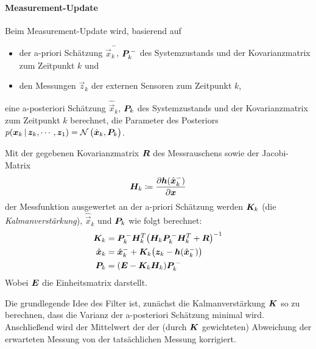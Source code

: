 				\paragraph{Measurement-Update} %
					Beim Measurement-Update wird, basierend auf
					\begin{itemize}
						\item der a-priori Schätzung \( \hat{\vec{x}}_k^- \), \( \bm{P}_k^{\,-} \) des Systemzustands und der Kovarianzmatrix zum Zeitpunkt \(k\) und
						\item den Messungen \( \vec{z}_k \) der externen Sensoren zum Zeitpunkt \(k\),
					\end{itemize}
					eine a-posteriori Schätzung \( \hat{\vec{x}}_k \), \( \bm{P}_k \) des Systemzustands und der Kovarianzmatrix zum Zeitpunkt \(k\) berechnet, \dh die Parameter des Posteriors \( p(\bm{x}_k \,\vert\, \bm{z}_k, \cdots, \bm{z}_1) = \mathcal{N}\,\big(\hat{\bm{x}}_k, \bm{P}_k\big) \).

					Mit der gegebenen Kovarianzmatrix \( \bm{R} \) des Messrauschens sowie der Jacobi-Matrix
					\begin{equation*}
						\bm{H}_k \coloneqq \frac{\partial \bm{h}(\hat{\bm{x}}_k^-)}{\partial \bm{x}}
					\end{equation*}
					der Messfunktion ausgewertet an der a-priori Schätzung werden \( \bm{K}_k \) (die \emph{Kalmanverstärkung}), \( \hat{\vec{x}}_k \) und \( \bm{P}_k \) wie folgt berechnet:
					\begin{align*}
						\bm{K}_k       & = \bm{P}_k^{\,-} \bm{H}_k^T \big( \bm{H}_k \bm{P}_k^{\,-} \bm{H}_k^T + \bm{R} \big)^{-1} \\
						\hat{\bm{x}}_k & = \hat{\bm{x}}_k^- + \bm{K}_k \big( \bm{z}_k - \bm{h}(\hat{\bm{x}}_k^-) \big)             \\
						\bm{P}_k       & = (\bm{E} - \bm{K}_k \bm{H}_k) \bm{P}_k^{\,-}
					\end{align*}
					Wobei \( \bm{E} \) die Einheitsmatrix darstellt.

					Die grundlegende Idee des Filter ist, zunächst die Kalmanverstärkung \( \bm{K} \) so zu berechnen, dass die Varianz der a-posteriori Schätzung minimal wird. Anschließend wird der Mittelwert der der (durch \( \bm{K} \) gewichteten) Abweichung der erwarteten Messung von der tatsächlichen Messung korrigiert.

